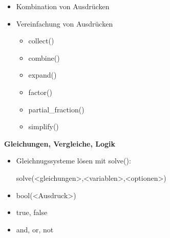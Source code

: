 \documentclass[a4paper,9pt,DIV15,twocolumn]{scrartcl}
\begin{document}
\begin{itemize}
 \item Kombination von Ausdrücken
 \item Vereinfachung von Ausdrücken
  \begin{itemize}
   \item collect()
   \item combine()
   \item expand()
   \item factor()
   \item partial\_fraction()
   \item simplify()
  \end{itemize}
\end{itemize}

\textbf{Gleichungen, Vergleiche, Logik}

\begin{itemize}
 \item Gleichnugssysteme lösen mit solve():
\begin{sagein}
 solve(<gleichungen>,<variablen>,<optionen>)
\end{sagein}
 \item bool(<Ausdruck>)
 \item true, false
 \item and, or, not
\end{itemize}
\end{document}
